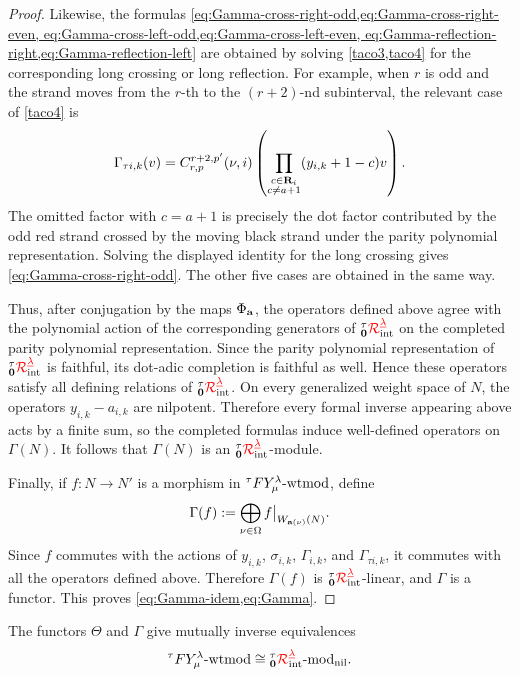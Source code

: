 \begin{proof}
Likewise, the formulas
\cref{eq:Gamma-cross-right-odd,eq:Gamma-cross-right-even,
eq:Gamma-cross-left-odd,eq:Gamma-cross-left-even,
eq:Gamma-reflection-right,eq:Gamma-reflection-left}
are obtained by solving \cref{taco3,taco4} for the corresponding long
crossing or long reflection. For example, when \(r\) is odd and the strand
moves from the \(r\)-th to the \((r+2)\)-nd subinterval, the relevant case of
\cref{taco4} is
\[
\Gamma_{\tau i,k}(v)
=
C_{r,p}^{r+2,p'}(\nu,i)
\left(
\prod_{\substack{c\in\mathbf{R}_i\\
c\neq a+1}}
(y_{i,k}+1-c)v
\right).
\]
The omitted factor with \(c=a+1\) is precisely the dot factor
contributed by the odd red strand crossed by the moving black strand
under the parity polynomial representation. Solving the displayed
identity for the long crossing gives
\cref{eq:Gamma-cross-right-odd}. The other five cases are obtained in the
same way.

Thus, after conjugation by the maps \(\Phi_{\mathbf{a}}\), the operators defined above
agree with the polynomial action of the corresponding generators of
\({{}^\tau_{\mathbf{0}}{\color{red}\mathcal{R}}^{{{\color{red}\underline{\lambda}}}}_{\text{int}}}\) on the completed parity polynomial representation. Since the parity
polynomial representation of \({{}^\tau_{\mathbf{0}}{\color{red}\mathcal{R}}^{{{\color{red}\underline{\lambda}}}}_{\text{int}}}\) is faithful, its dot-adic
completion is faithful as well. Hence these operators satisfy all defining
relations of \({{}^\tau_{\mathbf{0}}{\color{red}\mathcal{R}}^{{{\color{red}\underline{\lambda}}}}_{\text{int}}}\). On every generalized weight space of \(N\), the operators
\(y_{i,k}-a_{i,k}\) are nilpotent. Therefore every formal inverse appearing
above acts by a finite sum, so the completed formulas induce well-defined
operators on \(\Gamma(N)\). It follows that \(\Gamma(N)\) is an
\({{}^\tau_{\mathbf{0}}{\color{red}\mathcal{R}}^{{{\color{red}\underline{\lambda}}}}_{\text{int}}}\)-module. 

Finally, if \(f\colon N\to N'\) is a morphism in \({}^\tau F Y_\mu^\lambda\text{-wtmod}\), define
\[
   \Gamma(f)
   :=
   \bigoplus_{\nu\in\Omega}
   f\big|_{W_{\mathbf{a}(\nu)}(N)}.
\]
Since \(f\) commutes with the actions of \(y_{i,k}\), \(\sigma_{i,k}\),
\(\Gamma_{i,k}\), and \(\Gamma_{\tau i,k}\), it commutes with all the
operators defined above. Therefore \(\Gamma(f)\) is
\({{}^\tau_{\mathbf{0}}{\color{red}\mathcal{R}}^{{{\color{red}\underline{\lambda}}}}_{\text{int}}}\)-linear, and \(\Gamma\) is a functor. This proves
\cref{eq:Gamma-idem,eq:Gamma}.
\end{proof}




\begin{theorem}
\label{thm:equivalence}
    The functors \(\Theta\) and $\Gamma$ give mutually inverse equivalences
    \[
        {}^\tau F Y_\mu^\lambda\text{-wtmod} \cong {{}^\tau_{\mathbf{0}}{\color{red}\mathcal{R}}^{{{\color{red}\underline{\lambda}}}}_{\text{int}}}\text{-mod}_{\text{nil}}.
    \]
\end{theorem}

